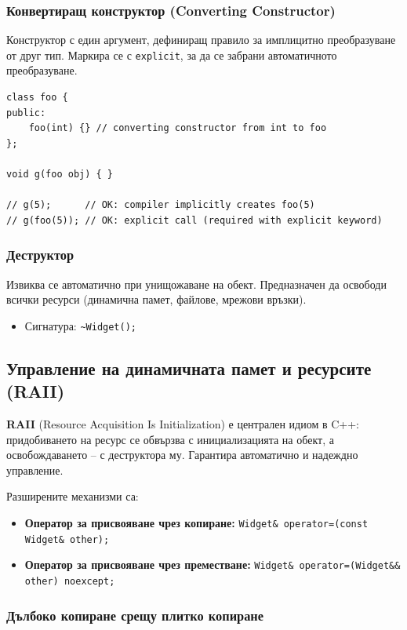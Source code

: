 \documentclass{scrartcl}
\begin{document}
\begin{FlushLeft}
\subsubsection{Конвертиращ конструктор (Converting Constructor)}
Конструктор с един аргумент, дефиниращ правило за имплицитно преобразуване от друг тип. Маркира се с \texttt{explicit}, за да се забрани автоматичното преобразуване.

\begin{lstlisting}
class foo {
public:
    foo(int) {} // converting constructor from int to foo
};

void g(foo obj) { }

// g(5);      // OK: compiler implicitly creates foo(5)
// g(foo(5)); // OK: explicit call (required with explicit keyword)
\end{lstlisting}

\subsubsection{Деструктор}
Извиква се автоматично при унищожаване на обект. Предназначен да освободи всички ресурси (динамична памет, файлове, мрежови връзки).
\begin{itemize}
    \item Сигнатура: \texttt{\textasciitilde Widget();}
\end{itemize}

\subsection{Управление на динамичната памет и ресурсите (RAII)}

\textbf{RAII} (Resource Acquisition Is Initialization) е централен идиом в C++: придобиването на ресурс се обвързва с инициализацията на обект, а освобождаването -- с деструктора му. Гарантира автоматично и надеждно управление.

Разширените механизми са:
\begin{itemize}
    \item \textbf{Оператор за присвояване чрез копиране:} \texttt{Widget\& operator=(const Widget\& other);}
    \item \textbf{Оператор за присвояване чрез преместване:} \texttt{Widget\& operator=(Widget\&\& other) noexcept;}
\end{itemize}

\subsubsection{Дълбоко копиране срещу плитко копиране}


\end{FlushLeft}
\end{document}
